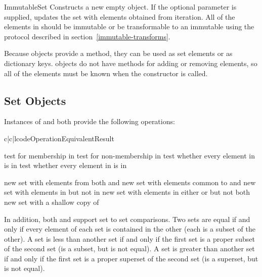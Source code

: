 \begin{classdesc}{ImmutableSet}{}
Constructs a new empty  object.  If the optional
 parameter is supplied, updates the set with elements obtained
from iteration.  All of the elements in  should be immutable or
be transformable to an immutable using the protocol described in
section~\ref{immutable-transforms}.

Because  objects provide a  method,
they can be used as set elements or as dictionary keys.  
objects do not have methods for adding or removing elements, so all of the
elements must be known when the constructor is called.
\end{classdesc}


\subsection{Set Objects \label{set-objects}}

Instances of  and  both provide
the following operations:

\begin{tableiii}{c|c|l}{code}{Operation}{Equivalent}{Result}

  \hline
         {test  for membership in }
         {test  for non-membership in }
         {test whether every element in  is in }
         {test whether every element in  is in }

  \hline
         {new set with elements from both  and }
         {new set with elements common to  and }
         {new set with elements in  but not in }
         {new set with elements in either  or  but not both}
         {new set with a shallow copy of }
\end{tableiii}

In addition, both  and 
support set to set comparisons.  Two sets are equal if and only if
every element of each set is contained in the other (each is a subset
of the other).
A set is less than another set if and only if the first set is a proper
subset of the second set (is a subset, but is not equal).
A set is greater than another set if and only if the first set is a proper
superset of the second set (is a superset, but is not equal).

